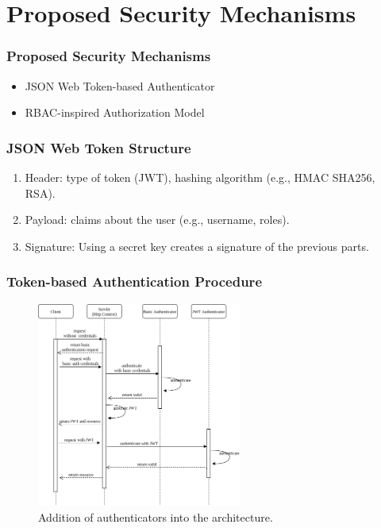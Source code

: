 \documentclass{beamer}
\begin{document}
\section{Proposed Security Mechanisms}
\begin{frame}
\frametitle{Proposed Security Mechanisms}
\begin{itemize}
  \setlength\itemsep{1.5em}
\item JSON Web Token-based Authenticator
\item RBAC-inspired Authorization Model
\end{itemize}
\end{frame}
\begin{frame}
\frametitle{JSON Web Token Structure}
\begin{enumerate}
  \setlength\itemsep{1.5em}  
\item Header: type of token (JWT), hashing algorithm (e.g., HMAC SHA256, RSA).
\item Payload: claims about the user (e.g., username, roles).
\item Signature: Using a secret key creates a signature of the previous parts.
\end{enumerate}
\end{frame}
\begin{frame}
\frametitle{Token-based Authentication Procedure}
\begin{figure} [ht] 
\begin{center}
\includegraphics[width=0.6\textwidth]{esh_auth_sequence}
\caption{Addition of authenticators into the architecture.}
\label{fig:esh_arch_authenticator}
\end{center}
\end{figure}
\end{frame}
\end{document}
